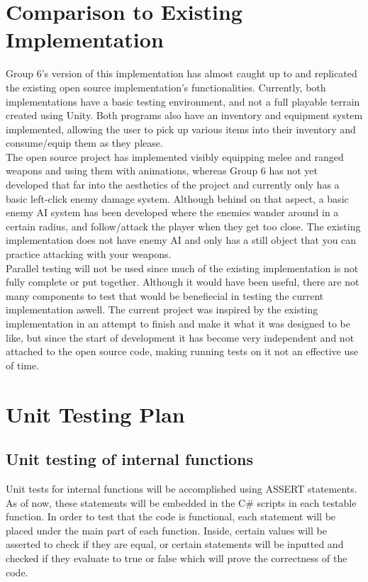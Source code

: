 \documentclass[12pt, titlepage]{article}
\begin{document}
\section{Comparison to Existing Implementation}	

Group 6's version of this implementation has almost caught up to and replicated the existing open source implementation's functionalities. Currently, both implementations have a basic testing environment, and not a full playable terrain created using Unity. Both programs also have an inventory and equipment system implemented, allowing the user to pick up various items into their inventory and consume/equip them as they please. \\

The open source project has implemented visibly equipping melee and ranged weapons and using them with animations, whereas Group 6 has not yet developed that far into the aesthetics of the project and currently only has a basic left-click enemy damage system. Although behind on that aspect, a basic enemy AI system has been developed where the enemies wander around in a certain radius, and follow/attack the player when they get too close.  The existing implementation does not have enemy AI and only has a still object that you can practice attacking with your weapons. \\

Parallel testing will not be used since much of the existing implementation is not fully complete or put together. Although it would have been useful, there are not many components to test that would be benefiecial in testing the current implementation aswell. The current project was inspired by the existing implementation in an attempt to finish and make it what it was designed to be like, but since the start of development it has become very independent and not attached to the open source code, making running tests on it not an effective use of time.


\section{Unit Testing Plan}

\subsection{Unit testing of internal functions}

Unit tests for internal functions will be accomplished using ASSERT statements. As of now, these statements will be embedded in the C\# scripts in each testable function. In order to test that the code is functional, each statement will be placed under the main part of each function. Inside, certain values will be asserted to check if they are equal, or certain statements will be inputted and checked if they evaluate to true or false which will prove the correctness of the code.   \\
\end{document}
